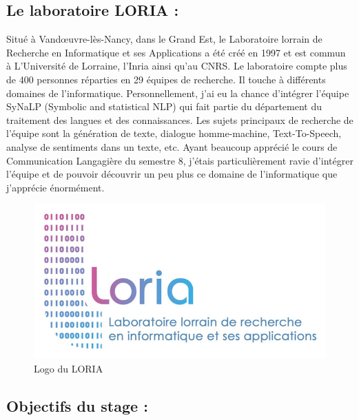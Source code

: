\documentclass[12pt]{article}
\begin{document}
\subsection{Le laboratoire LORIA :}

Situé à Vandœuvre-lès-Nancy, dans le Grand Est, le Laboratoire lorrain de Recherche en Informatique et ses Applications a été créé en 1997 et est commun à L’Université de Lorraine, l’Inria ainsi qu’au CNRS. Le laboratoire compte plus de 400 personnes réparties en 29 équipes de recherche. Il touche à différents domaines de l’informatique. 
Personnellement, j’ai eu la chance d’intégrer l’équipe SyNaLP (Symbolic and statistical NLP) qui fait partie du département du traitement des langues et des connaissances. Les sujets principaux de recherche de l’équipe sont la génération de texte, dialogue homme-machine, Text-To-Speech, analyse de sentiments dans un texte, etc. Ayant beaucoup apprécié le cours de Communication Langagière du semestre 8, j’étais particulièrement ravie d’intégrer l’équipe et de pouvoir découvrir un peu plus ce domaine de l’informatique que j’apprécie énormément. 



\begin{figure}[h]
    \centering
    \includegraphics[scale = 0.3]{logo_loria_complet.jpg}
    \caption{Logo du LORIA}
    \label{fig:my_label}
\end{figure}


\subsection{Objectifs du stage :}
\end{document}
